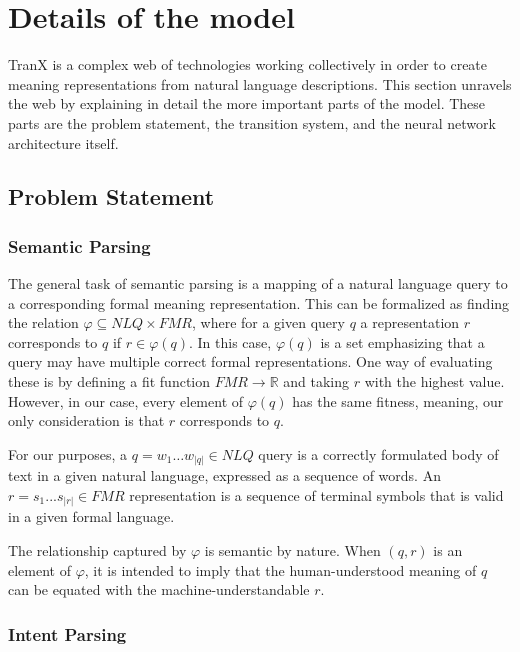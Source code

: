 \section{Details of the model}
TranX is a complex web of technologies working collectively in order to create meaning
representations from natural language descriptions. This section unravels the web by
explaining in detail the more important parts of the model. These parts are the problem
statement, the transition system, and the neural network architecture itself.

\subsection{Problem Statement}

\subsubsection{Semantic Parsing}\label{sec:parsing}

The general task of semantic parsing is a mapping of a natural language query to a
corresponding formal meaning representation. This can be formalized as finding the relation
\(\varphi \subseteq NLQ \times FMR\)\label{form:fmr}, where for a given query \(q\) a 
representation \(r\) corresponds to \(q\) if \(r \in \varphi(q)\). In this case,
\( \varphi(q) \) is a set emphasizing that a query may have multiple correct 
formal representations. One way of evaluating these is by defining a fit
function \( FMR \to \mathbb{R} \) and taking \( r \) with the highest value. 
However, in our case, every element of \( \varphi(q) \) has the same fitness,
meaning, our only consideration is that \(r\) corresponds to \(q\).

For our purposes, a \(q = w_{1} \dots w_{|q|} \in NLQ\) query is a correctly
formulated body of text in a given natural language, expressed as a sequence of words.
An \(r = s_{1} ... s_{|r|} \in FMR\) representation is a sequence of terminal symbols
that is valid in a given formal language.

The relationship captured by \(\varphi\) is semantic by nature. When \((q, r)\) is
an element of \(\varphi\), it is intended to imply that the human-understood
meaning of \(q\) can be equated with the machine-understandable \(r\). 
 
\subsubsection{Intent Parsing}

